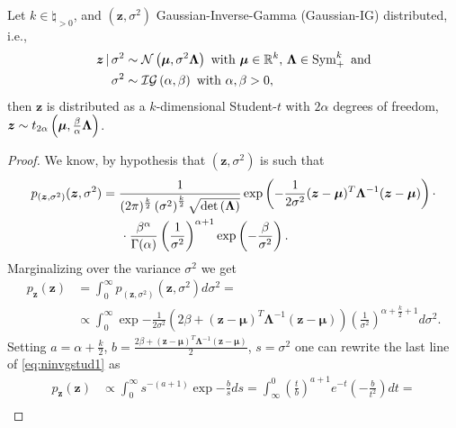 \begin{lemma} \label{lem:norminvgammastudent}
	Let $k \in \natural_{> 0}$, and $(\bm{z}, \sigma^2)$ Gaussian-Inverse-Gamma (Gaussian-IG) distributed, i.e.,
	\begin{align*}
		\bm{z} \, | \, \sigma^2 & \sim \mathcal{N}\left(\bm{\mu}, \sigma^2 \bm{\Lambda}\right) \text{ with } \bm{\mu} \in \mathbb{R}^k, \, \bm{\Lambda} \in \operatorname{Sym}_+^{k} \text{ and} \\
		\sigma^2 & \sim \mathcal{IG}\left(\alpha, \beta\right) \text{ with } \alpha, \beta > 0,
	\end{align*}
	then $\bm{z}$ is distributed as a $k$-dimensional Student-$t$ with $2 \alpha$ degrees of freedom, $\bm{z} \sim t_{2\alpha}\left(\bm{\mu}, \frac{\beta}{\alpha} \bm{\Lambda}\right)$.
\end{lemma}
\begin{proof}
	We know, by hypothesis that $(\bm{z}, \sigma^2)$ is such that
	\begin{align*}
		p_{(\bm{z}, \sigma^2)}(\bm{z}, \sigma^2) & = \frac{1}{(2 \pi)^{\frac{k}{2}} \left(\sigma^2\right)^{\frac{k}{2}} \sqrt{\operatorname{det}\left(\bm{\Lambda}\right)}} \operatorname{exp}\left(-\frac{1}{2 \sigma^2} (\bm{z} - \bm{\mu})^T \bm{\Lambda}^{-1} (\bm{z} - \bm{\mu})\right) \cdot \\
		& \kern14.65pt \cdot \frac{\beta^\alpha}{\Gamma(\alpha)} \left(\frac{1}{\sigma^2}\right)^{\alpha + 1} \operatorname{exp}\left(-\frac{\beta}{\sigma^2}\right).
	\end{align*}
	Marginalizing over the variance $\sigma^2$ we get
	\begin{equation} \label{eq:ninvgstud1}
		\begin{aligned}
			p_{\bm{z}}(\bm{z}) & = \int_{0}^{\infty} p_{(\bm{z}, \sigma^2)}(\bm{z}, \sigma^2) d \sigma^2 = \\
			& \propto \int_{0}^{\infty} \exp{-\frac{1}{2 \sigma^2} \left(2 \beta + (\bm{z} - \bm{\mu})^T \bm{\Lambda}^{-1} (\bm{z} - \bm{\mu})\right)} \left(\frac{1}{\sigma^2}\right)^{\alpha + \frac{k}{2} + 1} d \sigma^2.
		\end{aligned}
	\end{equation}
	Setting $a = \alpha + \frac{k}{2}$, $b = \frac{2 \beta + (\bm{z} - \bm{\mu})^T \bm{\Lambda}^{-1} (\bm{z} - \bm{\mu})}{2}$, $s = \sigma^2$ one can rewrite the last line of \cref{eq:ninvgstud1} as 
	\begin{equation} \label{eq:ninvgstud2}
		\begin{aligned}
			p_{\bm{z}}(\bm{z}) & \propto \int_{0}^{\infty} s^{-(a + 1)} \exp{-\frac{b}{s}} d s = \int_{\infty}^{0} \left(\frac{t}{b}\right)^{a + 1} e^{-t} \left(-\frac{b}{t^2}\right) dt = \\

\end{aligned}
\end{equation}
\end{proof}
